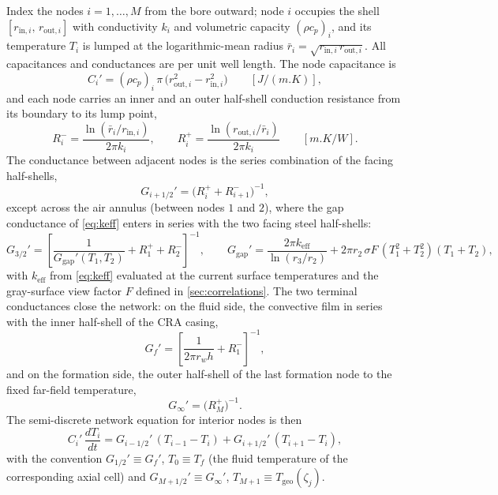 \documentclass[11pt]{article}
\begin{document}
Index the nodes $i = 1, \dots, M$ from the bore outward; node $i$
occupies the shell $[r_{\mathrm{in},i},\, r_{\mathrm{out},i}]$ with
conductivity $k_i$ and volumetric capacity $(\rho c_p)_i$, and its
temperature $T_i$ is lumped at the logarithmic-mean radius
$\bar r_i = \sqrt{r_{\mathrm{in},i}\, r_{\mathrm{out},i}}$. All
capacitances and conductances are per unit well length. The node
capacitance is
\begin{equation}
C_i' = (\rho c_p)_i\,\pi\,\bigl(r_{\mathrm{out},i}^2 -
r_{\mathrm{in},i}^2\bigr)
\qquad [\si{J/(m.K)}],
\label{eq:caps}
\end{equation}
and each node carries an inner and an outer half-shell conduction
resistance from its boundary to its lump point,
\begin{equation}
R_i^{-} = \frac{\ln(\bar r_i / r_{\mathrm{in},i})}{2\pi k_i},
\qquad
R_i^{+} = \frac{\ln(r_{\mathrm{out},i} / \bar r_i)}{2\pi k_i}
\qquad [\si{m.K/W}].
\label{eq:halfres}
\end{equation}
The conductance between adjacent nodes is the series combination of
the facing half-shells,
\begin{equation}
G_{i+1/2}' = \bigl(R_i^{+} + R_{i+1}^{-}\bigr)^{-1},
\label{eq:ginter}
\end{equation}
except across the air annulus (between nodes $1$ and $2$), where the
gap conductance of \cref{eq:keff} enters in series with the two
facing steel half-shells:
\begin{equation}
G_{3/2}' = \left[\frac{1}{G_{\mathrm{gap}}'(T_1, T_2)}
 + R_1^{+} + R_2^{-}\right]^{-1},
\qquad
G_{\mathrm{gap}}' =
 \frac{2\pi k_{\mathrm{eff}}}{\ln(r_3/r_2)}
 + 2\pi r_2\,\sigma F\,(T_1^2 + T_2^2)(T_1 + T_2),
\label{eq:ggap}
\end{equation}
with $k_{\mathrm{eff}}$ from \cref{eq:keff} evaluated at the current
surface temperatures and the gray-surface view factor $F$ defined in
\cref{sec:correlations}. The two terminal conductances close the
network: on the fluid side, the convective film in series with the
inner half-shell of the CRA casing,
\begin{equation}
G_f' = \left[\frac{1}{2\pi r_w h} + R_1^{-}\right]^{-1},
\label{eq:gfluid}
\end{equation}
and on the formation side, the outer half-shell of the last formation
node to the fixed far-field temperature,
\begin{equation}
G_\infty' = \bigl(R_M^{+}\bigr)^{-1}.
\label{eq:gouter}
\end{equation}
The semi-discrete network equation for interior nodes is then
\begin{equation}
C_i'\,\frac{dT_i}{dt} =
 G_{i-1/2}'\,(T_{i-1} - T_i) + G_{i+1/2}'\,(T_{i+1} - T_i),
\label{eq:network}
\end{equation}
with the convention $G_{1/2}' \equiv G_f'$, $T_0 \equiv T_f$ (the
fluid temperature of the corresponding axial cell) and
$G_{M+1/2}' \equiv G_\infty'$, $T_{M+1} \equiv
T_{\mathrm{geo}}(\zeta_j)$.
\end{document}
